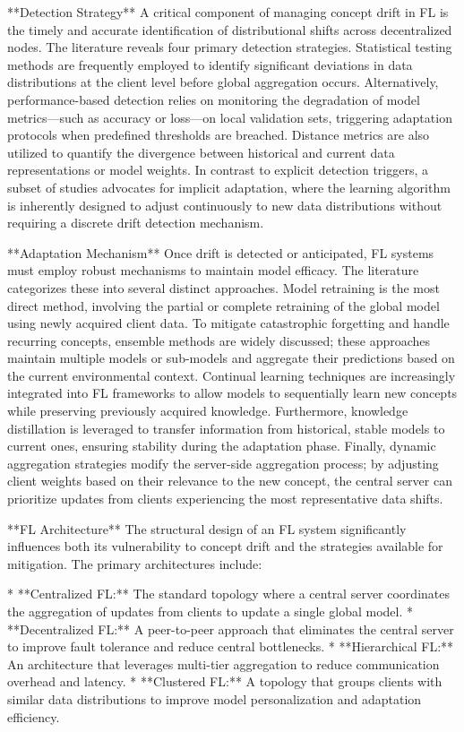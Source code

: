 \documentclass[journal]{IEEEtran}
\begin{document}
**Detection Strategy**
A critical component of managing concept drift in FL is the timely and accurate identification of distributional shifts across decentralized nodes. The literature reveals four primary detection strategies. Statistical testing methods are frequently employed to identify significant deviations in data distributions at the client level before global aggregation occurs. Alternatively, performance-based detection relies on monitoring the degradation of model metrics—such as accuracy or loss—on local validation sets, triggering adaptation protocols when predefined thresholds are breached. Distance metrics are also utilized to quantify the divergence between historical and current data representations or model weights. In contrast to explicit detection triggers, a subset of studies advocates for implicit adaptation, where the learning algorithm is inherently designed to adjust continuously to new data distributions without requiring a discrete drift detection mechanism.

**Adaptation Mechanism**
Once drift is detected or anticipated, FL systems must employ robust mechanisms to maintain model efficacy. The literature categorizes these into several distinct approaches. Model retraining is the most direct method, involving the partial or complete retraining of the global model using newly acquired client data. To mitigate catastrophic forgetting and handle recurring concepts, ensemble methods are widely discussed; these approaches maintain multiple models or sub-models and aggregate their predictions based on the current environmental context. Continual learning techniques are increasingly integrated into FL frameworks to allow models to sequentially learn new concepts while preserving previously acquired knowledge. Furthermore, knowledge distillation is leveraged to transfer information from historical, stable models to current ones, ensuring stability during the adaptation phase. Finally, dynamic aggregation strategies modify the server-side aggregation process; by adjusting client weights based on their relevance to the new concept, the central server can prioritize updates from clients experiencing the most representative data shifts.

**FL Architecture**
The structural design of an FL system significantly influences both its vulnerability to concept drift and the strategies available for mitigation. The primary architectures include:

*   **Centralized FL:** The standard topology where a central server coordinates the aggregation of updates from clients to update a single global model.
*   **Decentralized FL:** A peer-to-peer approach that eliminates the central server to improve fault tolerance and reduce central bottlenecks.
*   **Hierarchical FL:** An architecture that leverages multi-tier aggregation to reduce communication overhead and latency.
*   **Clustered FL:** A topology that groups clients with similar data distributions to improve model personalization and adaptation efficiency.
\end{document}
